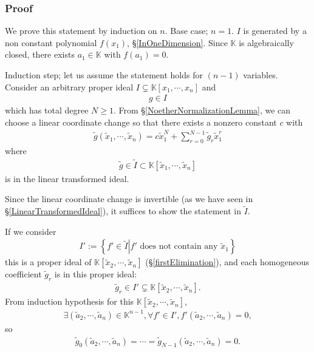 \documentclass[11pt]{book}
\begin{document}
\subsubsection{Proof}
We prove this statement by induction on $n$.
Base case; $n=1$.
$I$ is generated by a non constant polynomial $f(x_1)$, \S\ref{InOneDimension}.
Since $\mathbb{K}$ is algebraically closed, there exists $a_1 \in \mathbb{K}$ with $f(a_1) = 0$.

Induction step; let us assume the statement holds for $(n-1)$ variables.
Consider an arbitrary proper ideal $I \subsetneq \mathbb{K}[x_1, \cdots, x_n]$ and
\begin{eqnarray}
g \in I
\end{eqnarray}
which has total degree $N \geq 1$.
From \S\ref{NoetherNormalizationLemma}, we can choose a linear coordinate change so that there exists a nonzero constant $c$ with
\begin{eqnarray}
\tilde{g}(\tilde{x}_1, \cdots, \tilde{x}_n) = c \tilde{x}_1^N + \sum_{r=0}^{N-1} \tilde{g}_r \tilde{x}_1^r
\end{eqnarray}
where
\begin{eqnarray}
\tilde{g} \in \tilde{I} \subset \mathbb{K}[\tilde{x}_1,\cdots, \tilde{x}_n]
\end{eqnarray}
is in the linear transformed ideal.

Since the linear coordinate change is invertible (as we have seen in \S\ref{LinearTransformedIdeal}), it suffices to show the statement in $\tilde{I}$.

If we consider
\begin{eqnarray}
I' := \left\{ \left. f' \in \tilde{I} \right| \text{$f'$ does not contain any $\tilde{x}_1$} \right\}
\end{eqnarray}
this is a proper ideal of $\mathbb{K}[\tilde{x}_2,\cdots, \tilde{x}_n]$ (\S\ref{firstElimination}), and each homogeneous coefficient $\tilde{g}_r$ is in this proper ideal:
\begin{eqnarray}
\tilde{g}_r \in I' \subsetneq \mathbb{K}[\tilde{x}_2,\cdots, \tilde{x}_n].
\end{eqnarray}
From induction hypothesis for this $\mathbb{K}[\tilde{x}_2,\cdots, \tilde{x}_n]$,
\begin{eqnarray}
\exists (\tilde{a}_2, \cdots, \tilde{a}_n) \in \mathbb{K}^{n-1}, \forall f' \in I', f'(\tilde{a}_2, \cdots, \tilde{a}_n) = 0,
\end{eqnarray}
so
\begin{eqnarray}
\tilde{g}_0(\tilde{a}_2, \cdots, \tilde{a}_n) = \cdots = \tilde{g}_{N-1}(\tilde{a}_2, \cdots, \tilde{a}_n) = 0.
\end{eqnarray}
\end{document}
